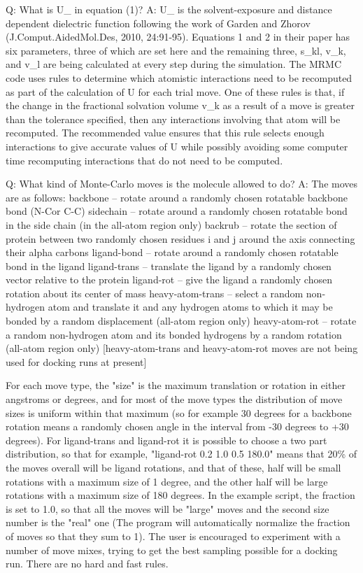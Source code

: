 \documentclass{article}      %
\begin{document}
Q:  What is U_ in equation (1)?
A:  U_ is the solvent-exposure and distance dependent dielectric function following the work of Garden and Zhorov (J.Comput.AidedMol.Des, 2010, 24:91-95). Equations 1 and 2 in their paper has six parameters, three of which are set here and the remaining three, s_{kl}, v_{k}, and v_{l} are being calculated at every step during the simulation. The MRMC code uses rules to determine which atomistic interactions need to be recomputed as part of the calculation of \Delta U for each trial move.  One of these rules is that, if the change in the fractional solvation volume v_{k} as a result of a move is greater than the tolerance specified, then any interactions involving that atom will be recomputed.  The recommended value ensures that this rule selects enough interactions to give accurate values of \Delta U while possibly avoiding some computer time recomputing interactions that do not need to be computed.  

Q:  What kind of Monte-Carlo moves is the molecule allowed to do?
A:  The moves are as follows:
backbone -- rotate around a randomly chosen rotatable backbone bond (N-C\alpha or C\alpha-C)
sidechain -- rotate around a randomly chosen rotatable bond in the side chain (in the all-atom region only)
backrub -- rotate the section of protein between two randomly chosen residues i and j around the axis connecting their alpha carbons
ligand-bond -- rotate around a randomly chosen rotatable bond in the ligand 
ligand-trans -- translate the ligand by a randomly chosen vector relative to the protein
ligand-rot -- give the ligand a randomly chosen rotation about its center of mass
heavy-atom-trans -- select a random non-hydrogen atom and translate it and any hydrogen atoms to which it may be bonded by a random displacement (all-atom region only)
heavy-atom-rot -- rotate a random non-hydrogen atom and its bonded hydrogens by a random rotation (all-atom region only)
[heavy-atom-trans and heavy-atom-rot moves are not being used for docking runs at present]  

For each move type, the "size" is the maximum translation or rotation in either angstroms or degrees, and for most of the move types the distribution of move sizes is uniform within that maximum (so for example 30 degrees for a backbone rotation means a randomly chosen angle in the interval from -30 degrees to +30 degrees).  For ligand-trans and ligand-rot it is possible to choose a two part distribution, so that for example, "ligand-rot 0.2 1.0 0.5 180.0" means that 20\% of the moves overall will be ligand rotations, and that of these, half will be small rotations with a maximum size of 1 degree, and the other half will be large rotations with a maximum size of 180 degrees.  In the example script, the fraction is set to 1.0, so that all the moves will be "large" moves and the second size number is the "real" one (The program will automatically normalize the fraction of moves so that they sum to 1). The user is encouraged to experiment with a number of move mixes, trying to get the best sampling possible for a docking run. There are no hard and fast rules.
\end{document}
